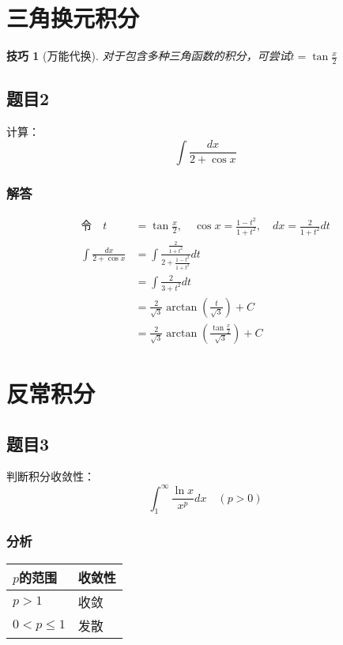 \documentclass[12pt]{article}
\newtheorem{trick}{技巧}
\begin{document}
\section{三角换元积分}

\begin{trick}[万能代换]
对于包含多种三角函数的积分，可尝试$ t = \tan\frac{x}{2} $
\end{trick}

\subsection*{题目2}
计算：
\[ \int \frac{dx}{2+\cos x} \]

\subsubsection*{解答}
\begin{align*}
\text{令} \quad t &= \tan\frac{x}{2}, \quad \cos x = \frac{1-t^2}{1+t^2}, \quad dx = \frac{2}{1+t^2}dt \\
\int \frac{dx}{2+\cos x} &= \int \frac{\frac{2}{1+t^2}}{2 + \frac{1-t^2}{1+t^2}} dt \\
&= \int \frac{2}{3 + t^2} dt \\
&= \frac{2}{\sqrt{3}} \arctan\left( \frac{t}{\sqrt{3}} \right) + C \\
&= \frac{2}{\sqrt{3}} \arctan\left( \frac{\tan\frac{x}{2}}{\sqrt{3}} \right) + C
\end{align*}

\section{反常积分}

\subsection*{题目3}
判断积分收敛性：
\[ \int_1^\infty \frac{\ln x}{x^p} dx \quad (p > 0) \]

\subsubsection*{分析}
\begin{table}[h]
\centering
\begin{tabular}{ll}
\toprule
$p$的范围 & 收敛性 \\
\midrule
$p > 1$ & 收敛 \\
$0 < p \leq 1$ & 发散 \\
\bottomrule
\end{tabular}
\end{table}
\end{document}
